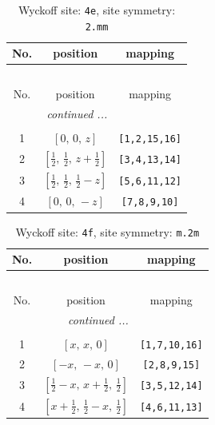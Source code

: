 \documentclass[fleqn,8pt]{jsarticle}
\begin{document}
\renewcommand{\arraystretch}{1.2}
\begin{longtable}{ccc}
\caption{Wyckoff site: {\tt 4e}, site symmetry: {\tt 2.mm}}
 \\
 \hline \hline
No. & position & mapping \\ \hline \endfirsthead

\multicolumn{2}{l}{\tablename\ \thetable{}} \\
 \hline \hline
No. & position & mapping \\ \hline \endhead

 \hline \hline
\multicolumn{2}{r}{\footnotesize\it continued ...} \\ \endfoot

 \hline \hline
\multicolumn{2}{r}{} \\ \endlastfoot

1 & $\left[ 0,\, 0,\, z \right]$ & {\tt [1,2,15,16]} \\ \hline
2 & $\left[ \frac{1}{2},\, \frac{1}{2},\, z + \frac{1}{2} \right]$ & {\tt [3,4,13,14]} \\ \hline
3 & $\left[ \frac{1}{2},\, \frac{1}{2},\, \frac{1}{2} - z \right]$ & {\tt [5,6,11,12]} \\ \hline
4 & $\left[ 0,\, 0,\, - z \right]$ & {\tt [7,8,9,10]} \\
\end{longtable}
\renewcommand{\arraystretch}{1.2}
\begin{longtable}{ccc}
\caption{Wyckoff site: {\tt 4f}, site symmetry: {\tt m.2m}}
 \\
 \hline \hline
No. & position & mapping \\ \hline \endfirsthead

\multicolumn{2}{l}{\tablename\ \thetable{}} \\
 \hline \hline
No. & position & mapping \\ \hline \endhead

 \hline \hline
\multicolumn{2}{r}{\footnotesize\it continued ...} \\ \endfoot

 \hline \hline
\multicolumn{2}{r}{} \\ \endlastfoot

1 & $\left[ x,\, x,\, 0 \right]$ & {\tt [1,7,10,16]} \\ \hline
2 & $\left[ - x,\, - x,\, 0 \right]$ & {\tt [2,8,9,15]} \\ \hline
3 & $\left[ \frac{1}{2} - x,\, x + \frac{1}{2},\, \frac{1}{2} \right]$ & {\tt [3,5,12,14]} \\ \hline
4 & $\left[ x + \frac{1}{2},\, \frac{1}{2} - x,\, \frac{1}{2} \right]$ & {\tt [4,6,11,13]} \\
\end{longtable}
\end{document}
